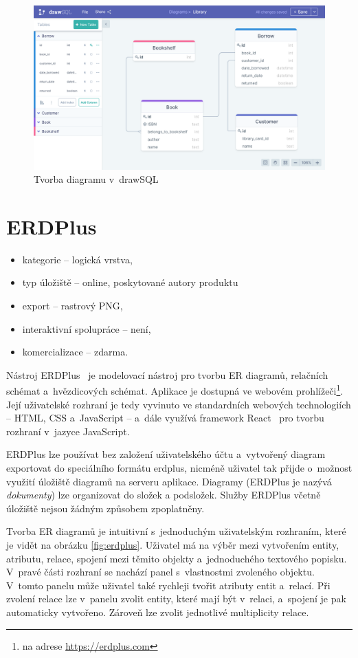 \begin{figure}
  \centering
  \includegraphics[width=\textwidth]{../img/drawsql.png}
  \caption{Tvorba diagramu v~drawSQL}
  \label{fig:drawsql}
\end{figure}

\section{ERDPlus}
\begin{itemize}
  \item kategorie -- logická vrstva,
  \item typ úložiště -- online, poskytované autory produktu
  \item export -- rastrový PNG,
  \item interaktivní spolupráce -- není,
  \item komercializace -- zdarma.
\end{itemize}

Nástroj ERDPlus~\cite{erdplus21} je modelovací nástroj pro tvorbu ER diagramů,
relačních schémat a~hvězdicových schémat. Aplikace je dostupná ve webovém
prohlížeči\footnote{na adrese \url{https://erdplus.com}}. Její uživatelské
rozhraní je tedy vyvinuto ve standardních webových technologiích -- HTML, CSS
a~JavaScript -- a~dále využívá framework React~\cite{react2021} pro tvorbu
rozhraní v~jazyce JavaScript.

ERDPlus lze používat bez založení uživatelského účtu a~vytvořený diagram
exportovat do speciálního formátu erdplus, nicméně uživatel tak přijde o~možnost
využití úložiště diagramů na serveru aplikace. Diagramy (ERDPlus je nazývá
\emph{dokumenty}) lze organizovat do složek a podsložek. Služby ERDPlus včetně
úložiště nejsou žádným způsobem zpoplatněny.

Tvorba ER diagramů je intuitivní s~jednoduchým uživatelským rozhraním, které je
vidět na obrázku \ref{fig:erdplus}. Uživatel má na výběr mezi vytvořením entity,
atributu, relace, spojení mezi těmito objekty a~jednoduchého textového popisku.
V~pravé části rozhraní se nachází panel s~vlastnostmi zvoleného objektu. V~tomto
panelu může uživatel také rychleji tvořit atributy entit a~relací. Při zvolení
relace lze v~panelu zvolit entity, které mají být v~relaci, a~spojení je pak
automaticky vytvořeno. Zároveň lze zvolit jednotlivé multiplicity relace.

